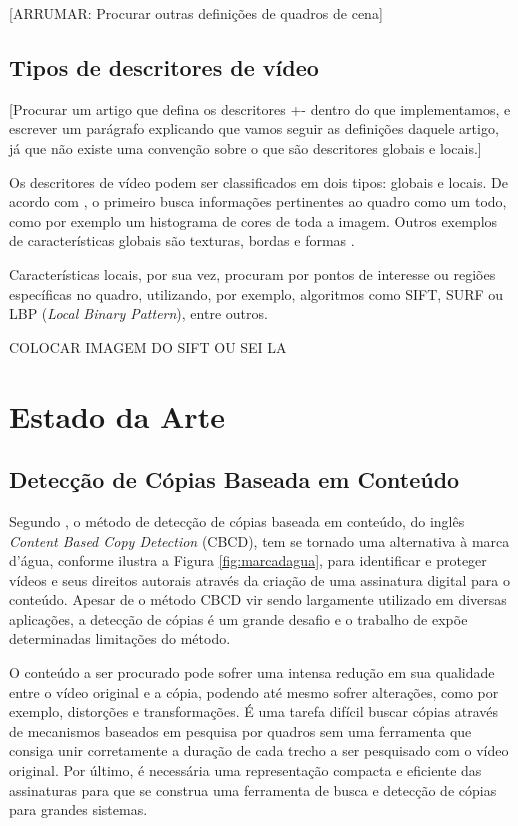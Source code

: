        [ARRUMAR: Procurar outras definições de quadros de cena]
        
        \section{Tipos de descritores de vídeo}
        \label{sec:tiposdescritores}
        
        [Procurar um artigo que defina os descritores +- dentro do que implementamos, e escrever um parágrafo explicando que vamos seguir as definições daquele artigo, já que não existe uma convenção sobre o que são descritores globais e locais.]


	Os descritores de vídeo podem ser classificados em dois tipos: globais e locais. De acordo com \citeauthor{de2012combinaccao}, o primeiro busca informações pertinentes ao quadro como um todo, como por exemplo um histograma de cores de toda a imagem. Outros exemplos de características globais são texturas, bordas e formas  \citeauthor{law2007video}.
       
    Características locais, por sua vez, procuram por pontos de interesse ou regiões específicas no quadro, utilizando, por exemplo, algoritmos como SIFT, SURF ou LBP (\textit{Local Binary Pattern}), entre outros.      
    
    COLOCAR IMAGEM DO SIFT OU SEI LA

\chapter{Estado da Arte}
\label{chap:estadodaarte}

     \section{Detecção de Cópias Baseada em Conteúdo} 
	Segundo \citeauthor{jiang2011pku}, o método de detecção de cópias baseada em conteúdo, do inglês \textit{Content Based Copy Detection} (CBCD), tem se tornado uma alternativa à marca d'água, conforme ilustra a Figura \ref{fig:marcadagua}, para identificar e proteger vídeos e seus direitos autorais através da criação de uma assinatura digital para o conteúdo. Apesar de o método CBCD vir sendo largamente utilizado em diversas aplicações, a detecção de cópias é um grande desafio e o trabalho de \citeauthor{jiang2011pku} expõe determinadas limitações do método.
    
    O conteúdo a ser procurado pode sofrer uma intensa redução em sua qualidade entre o vídeo original e a cópia, podendo até mesmo sofrer alterações, como por exemplo, distorções e transformações. É uma tarefa difícil buscar cópias através de mecanismos baseados em pesquisa por quadros sem uma ferramenta que consiga unir corretamente a duração de cada trecho a ser pesquisado com o vídeo original. Por último, é necessária uma representação compacta e eficiente das assinaturas para que se construa uma ferramenta de busca e detecção de cópias para grandes sistemas.
    
